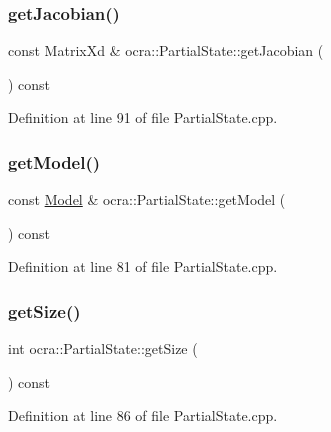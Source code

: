 \subsubsection{\texorpdfstring{get\+Jacobian()}{getJacobian()}}
{\footnotesize\ttfamily const Matrix\+Xd \& ocra\+::\+Partial\+State\+::get\+Jacobian (\begin{DoxyParamCaption}{ }\end{DoxyParamCaption}) const}



Definition at line 91 of file Partial\+State.\+cpp.

\hypertarget{classocra_1_1PartialState_a2de65bbf0d2bb85a98d444c3f3bf0b06}{}\label{classocra_1_1PartialState_a2de65bbf0d2bb85a98d444c3f3bf0b06} 
\subsubsection{\texorpdfstring{get\+Model()}{getModel()}}
{\footnotesize\ttfamily const \hyperlink{classocra_1_1Model}{Model} \& ocra\+::\+Partial\+State\+::get\+Model (\begin{DoxyParamCaption}{ }\end{DoxyParamCaption}) const}



Definition at line 81 of file Partial\+State.\+cpp.

\hypertarget{classocra_1_1PartialState_a220a155999e190427083af329d1f52b0}{}\label{classocra_1_1PartialState_a220a155999e190427083af329d1f52b0} 
\subsubsection{\texorpdfstring{get\+Size()}{getSize()}}
{\footnotesize\ttfamily int ocra\+::\+Partial\+State\+::get\+Size (\begin{DoxyParamCaption}{ }\end{DoxyParamCaption}) const}



Definition at line 86 of file Partial\+State.\+cpp.

\hypertarget{classocra_1_1PartialState_a28f537d2c569eddb7f7d6dbbea073226}{}\label{classocra_1_1PartialState_a28f537d2c569eddb7f7d6dbbea073226} 

